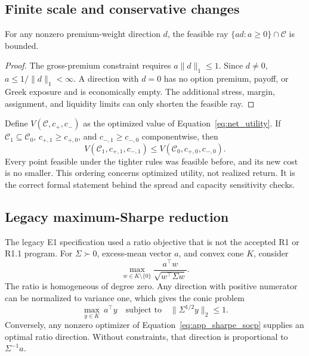 \subsection{Finite scale and conservative changes}

\begin{lemma}
For any nonzero premium-weight direction \(d\), the feasible ray
\(\{ad:a\ge0\}\cap\mathcal C\) is bounded.
\end{lemma}
\begin{proof}
The gross-premium constraint requires \(a\|d\|_1\le1\). Since \(d\ne0\),
\(a\le1/\|d\|_1<\infty\). A direction with \(d=0\) has no option premium, payoff, or
Greek exposure and is economically empty. The additional stress, margin, assignment, and
liquidity limits can only shorten the feasible ray.
\end{proof}

Define \(V(\mathcal C,c_+,c_-)\) as the optimized value of
Equation~\eqref{eq:net_utility}. If \(\mathcal C_1\subseteq\mathcal C_0\),
\(c_{+,1}\ge c_{+,0}\), and \(c_{-,1}\ge c_{-,0}\) componentwise, then
\begin{equation}
  V(\mathcal C_1,c_{+,1},c_{-,1})
  \le V(\mathcal C_0,c_{+,0},c_{-,0}).
  \label{eq:app_conservative_value}
\end{equation}
Every point feasible under the tighter rules was feasible before, and its new cost is no
smaller. This ordering concerns optimized utility, not realized return. It is the correct
formal statement behind the spread and capacity sensitivity checks.

\subsection{Legacy maximum-Sharpe reduction}

The legacy E1 specification used a ratio objective that is not the accepted R1 or R1.1
program.
For \(\Sigma\succ0\), excess-mean vector \(a\), and convex cone \(K\), consider
\begin{equation}
  \max_{w\in K\setminus\{0\}}
  \frac{a^\top w}{\sqrt{w^\top\Sigma w}}.
  \label{eq:app_sharpe_ratio}
\end{equation}
The ratio is homogeneous of degree zero. Any direction with positive numerator can be
normalized to variance one, which gives the conic problem
\begin{equation}
  \max_{y\in K}\ a^\top y
  \quad\text{subject to}\quad
  \|\Sigma^{1/2}y\|_2\le1.
  \label{eq:app_sharpe_socp}
\end{equation}
Conversely, any nonzero optimizer of Equation~\eqref{eq:app_sharpe_socp} supplies an
optimal ratio direction. Without constraints, that direction is proportional to
\(\Sigma^{-1}a\).

